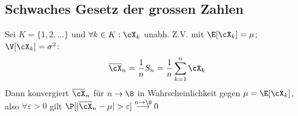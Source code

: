 \subsection{Schwaches Gesetz der grossen Zahlen}
\label{sec:weak-law-of-large-numbers}
 Sei $K = \{ 1, 2, \ldots \}$ und $\forall k \in K : \cX_k$ unabh. Z.V. mit $\E[\cX_k] = \mu$; $\V[\cX_k] = \sigma^2$:
\[
    \overline{\cX}_n = \frac{1}{n} S_n = \frac{1}{n} \sum_{k = 1}^{n} \cX_k
\]
Dann konvergiert $\overline{\cX}_n$ für $n \rightarrow \8$ in Wahrscheinlichkeit gegen $\mu = \E[\cX_k]$,
also $\forall \varepsilon > 0$ gilt $\P[|\overline{\cX}_n - \mu| > \varepsilon] \overset{n \rightarrow \8}{\longrightarrow} 0$
